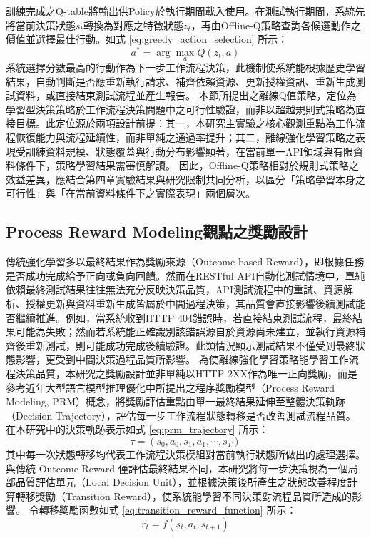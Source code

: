 \begin{ZhChapter}
\text 訓練完成之Q-table將輸出供Policy於執行期間載入使用。在測試執行期間，系統先將當前決策狀態$s_t$轉換為對應之特徵狀態$z_t$，再由Offline-Q策略查詢各候選動作之價值並選擇最佳行動。如式 \eqref{eq:greedy_action_selection} 所示：
\begin{equation}
\label{eq:greedy_action_selection}
a^*=\arg\max_a Q(z_t,a)
\end{equation}
\text 系統選擇分數最高的行動作為下一步工作流程決策，此機制使系統能根據歷史學習結果，自動判斷是否應重新執行請求、補齊依賴資源、更新授權資訊、重新生成測試資料，或直接結束測試流程並產生報告。
\text 本節所提出之離線Q值策略，定位為學習型決策策略於工作流程決策問題中之可行性驗證，而非以超越規則式策略為直接目標。此定位源於兩項設計前提：其一，本研究主實驗之核心觀測重點為工作流程恢復能力與流程延續性，而非單純之通過率提升；其二，離線強化學習策略之表現受訓練資料規模、狀態覆蓋與行動分布影響顯著，在當前單一API領域與有限資料條件下，策略學習結果需審慎解讀。
\text 因此，Offline-Q策略相對於規則式策略之效益差異，應結合第四章實驗結果與研究限制共同分析，以區分「策略學習本身之可行性」與「在當前資料條件下之實際表現」兩個層次。

\subsection{Process Reward Modeling觀點之獎勵設計}
\text 傳統強化學習多以最終結果作為獎勵來源（Outcome-based Reward），即根據任務是否成功完成給予正向或負向回饋。然而在RESTful API自動化測試情境中，單純依賴最終測試結果往往無法充分反映決策品質，API測試流程中的重試、資源解析、授權更新與資料重新生成皆屬於中間過程決策，其品質會直接影響後續測試能否繼續推進。例如，當系統收到HTTP 404錯誤時，若直接結束測試流程，最終結果可能為失敗；然而若系統能正確識別該錯誤源自於資源尚未建立，並執行資源補齊後重新測試，則可能成功完成後續驗證。此類情況顯示測試結果不僅受到最終狀態影響，更受到中間決策過程品質所影響。
\text 為使離線強化學習策略能學習工作流程決策品質，本研究之獎勵設計並非單純以HTTP 2XX作為唯一正向獎勵，而是參考近年大型語言模型推理優化中所提出之程序獎勵模型（Process Reward Modeling, PRM）概念\parencite{Lightman2023PRM}，將獎勵評估重點由單一最終結果延伸至整體決策軌跡（Decision Trajectory），評估每一步工作流程狀態轉移是否改善測試流程品質。
\text 在本研究中的決策軌跡表示如式 \eqref{eq:prm_trajectory} 所示：
\begin{equation}
\label{eq:prm_trajectory}
\tau=
(s_0,a_0,s_1,a_1,\cdots,s_T)
\end{equation}
\text 其中每一次狀態轉移均代表工作流程決策模組對當前執行狀態所做出的處理選擇。與傳統 Outcome Reward 僅評估最終結果不同，本研究將每一步決策視為一個局部品質評估單元（Local Decision Unit），並根據決策後所產生之狀態改善程度計算轉移獎勵（Transition Reward），使系統能學習不同決策對流程品質所造成的影響。
令轉移獎勵函數如式 \eqref{eq:transition_reward_function} 所示：
\begin{equation}
\label{eq:transition_reward_function}
r_t=
f(s_t,a_t,s_{t+1})
\end{equation}


\end{ZhChapter}
